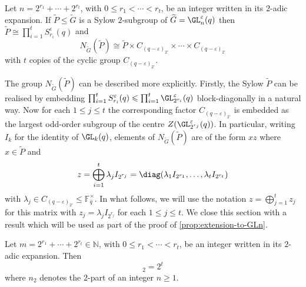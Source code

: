 \documentclass[eqthmnum, nocolour]{jt-calcs}
\newcommand{\wt}[1]{\widetilde{#1}}
\renewcommand{\epsilon}{\varepsilon}
\begin{document}
\begin{thm}\label{thm:carter-fong}
Let $n = 2^{r_1} + \cdots + 2^{r_t}$, with $0\leqslant r_1 < \cdots < r_t$,  be an integer written in its $2$-adic expansion. If $\widetilde{P} \leqslant \widetilde{G}$ is a Sylow $2$-subgroup of $\widetilde{G} = \GL_n^{\varepsilon}(q)$ then $\widetilde{P} \cong \prod_{i = 1}^t S_{r_i}^{\varepsilon}(q)$ and
\begin{equation}\label{CF2}
N_{\wt{G}}(\wt{P}) \cong \wt{P} \times C_{(q-\epsilon)_{2'}}\times\cdots\times C_{(q-\epsilon)_{2'}}
\end{equation}
with $t$ copies of the cyclic group $C_{(q-\epsilon)_{2'}}$.
\end{thm}

\begin{pa}
The group $N_{\wt{G}}(\wt{P})$ can be described more explicitly. Firstly, the Sylow $\widetilde{P}$ can be realised by embedding $\prod_{i = 1}^t S_{r_i}^{\varepsilon}(q) \leqslant \prod_{i = 1}^t \GL_{2^{r_i}}^{\varepsilon}(q)$ block-diagonally in a natural way. Now for each $1\leq j\leq t$ the corresponding factor $C_{(q-\epsilon)_{2'}}$ is embedded as the largest odd-order subgroup of the centre $Z(\GL^\varepsilon_{2^{r_j}}(q))$. In particular, writing $I_k$ for the identity of $\GL_k(q)$, elements of $N_{\wt{G}}(\wt{P})$ are of the form $xz$ where $x\in\wt{P}$ and
\begin{equation}\label{CF3}
z = \bigoplus_{i=1}^t \lambda_j I_{2^{r_j}} = \diag(\lambda_1 I_{2^{r_1}},\dots,\lambda_t I_{2^{r_t}})
\end{equation}
with $\lambda_j \in C_{(q-\epsilon)_{2'}}\leq \mathbb{F}_{\overline{q}}^\times$. In what follows, we will use the notation $z=\bigoplus_{j=1}^t z_j$ for this matrix with $z_j = \lambda_j I_{2^{r_j}}$ for each $1\leq j\leq t$. We close this section with a result which will be used as part of the proof of \cref{prop:extension-to-GLn}.
\end{pa}

\begin{lem}\label{cor:index-GL}
Let $m = 2^{r_1}+\cdots+2^{r_t} \in \mathbb{N}$, with $0 \leqslant r_1 < \cdots < r_t$, be an integer written in its $2$-adic expansion.  Then
\begin{equation*}
[\GL_{2m}^{\varepsilon}(q) : \GL_m^{\varepsilon}(q)^2]_2 = 2^t
\end{equation*}
where $n_2$ denotes the $2$-part of an integer $n \geqslant 1$.
\end{lem}
\end{document}
